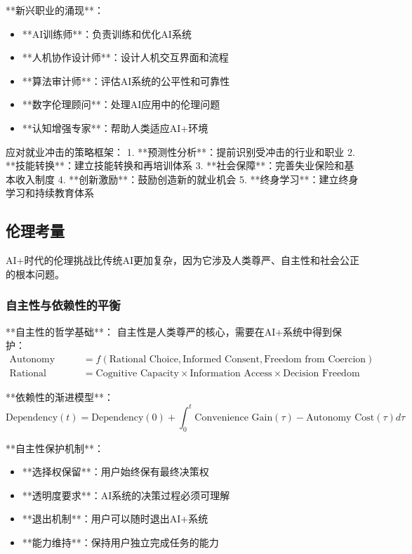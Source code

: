 **新兴职业的涌现**：
\begin{itemize}
\item **AI训练师**：负责训练和优化AI系统
\item **人机协作设计师**：设计人机交互界面和流程
\item **算法审计师**：评估AI系统的公平性和可靠性
\item **数字伦理顾问**：处理AI应用中的伦理问题
\item **认知增强专家**：帮助人类适应AI+环境
\end{itemize}

\begin{center}
应对就业冲击的策略框架：
1. **预测性分析**：提前识别受冲击的行业和职业
2. **技能转换**：建立技能转换和再培训体系
3. **社会保障**：完善失业保险和基本收入制度
4. **创新激励**：鼓励创造新的就业机会
5. **终身学习**：建立终身学习和持续教育体系
\end{center}

\subsection{伦理考量}

AI+时代的伦理挑战比传统AI更加复杂，因为它涉及人类尊严、自主性和社会公正的根本问题。

\subsubsection{自主性与依赖性的平衡} %

**自主性的哲学基础**：
自主性是人类尊严的核心，需要在AI+系统中得到保护：
\begin{align}
\text{Autonomy} &= f(\text{Rational Choice}, \text{Informed Consent}, \text{Freedom from Coercion}) \\
\text{Rational Choice} &= \text{Cognitive Capacity} \times \text{Information Access} \times \text{Decision Freedom}
\end{align}

**依赖性的渐进模型**：
\begin{equation}
\text{Dependency}(t) = \text{Dependency}(0) + \int_0^t \text{Convenience Gain}(\tau) - \text{Autonomy Cost}(\tau) d\tau
\end{equation}

**自主性保护机制**：
\begin{itemize}
\item **选择权保留**：用户始终保有最终决策权
\item **透明度要求**：AI系统的决策过程必须可理解
\item **退出机制**：用户可以随时退出AI+系统
\item **能力维持**：保持用户独立完成任务的能力
\end{itemize}

